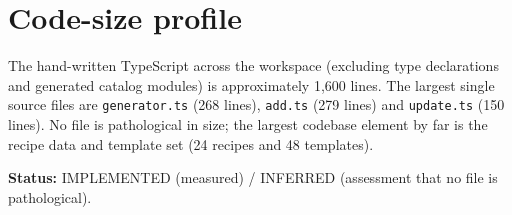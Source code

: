 \section{Code-size profile}

The hand-written TypeScript across the workspace (excluding type declarations and
generated catalog modules) is approximately 1{,}600 lines. The largest single
source files are \texttt{generator.ts} (268 lines), \texttt{add.ts} (279 lines) and
\texttt{update.ts} (150 lines). No file is pathological in size; the largest
codebase element by far is the recipe data and template set (24 recipes and 48
templates).

\textbf{Status:} IMPLEMENTED (measured) / INFERRED (assessment that no file is
pathological).
